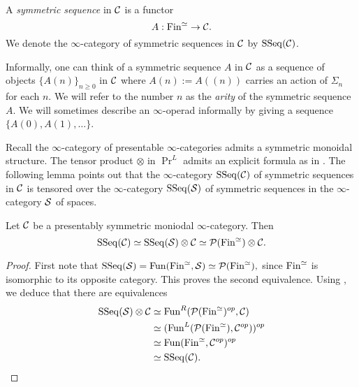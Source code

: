 \begin{definition}
	A \emph{symmetric sequence} in ${\mathcal{C}}$ is a functor 
	$$
	A:\operatorname{Fin}^{\simeq} \to {\mathcal{C}}.
	$$ We denote the $\infty$-category of symmetric sequences in ${\mathcal{C}}$ by $\operatorname{SSeq}({\mathcal{C}})$.
\end{definition}
\begin{remark}
	Informally, one can think of a symmetric sequence $A$ in ${\mathcal{C}}$ as a sequence of objects $\{A(n)\}_{n\geq 0}$ in ${\mathcal{C}}$ where $A(n):= A((n))$ carries an action of $\Sigma_n$ for each $n$.
	We will refer to the number $n$ as the \emph{arity} of the symmetric sequence $A$. We will sometimes describe an $\infty$-operad informally by giving a sequence $\{A(0), A(1), \dots \}$.
	
\end{remark}
Recall the $\infty$-category of presentable $\infty$-categories admits a symmetric monoidal structure. The tensor product $\otimes$ in $\Pr^L$ admits an explicit formula as in \cite[Proposition 4.8.1.17.]{HA}. The following lemma points out that the $\infty$-category $\operatorname{SSeq}({\mathcal{C}})$ of symmetric sequences in ${\mathcal{C}}$ is tensored over the $\infty$-category $\operatorname{SSeq}(\operatorname{\mathcal{S}})$ of symmetric sequences in the $\infty$-category ${\mathcal{S}}$ of spaces.
\begin{lemma}
	 Let ${\mathcal{C}}$ be a presentably symmetric moniodal $\infty$-category.
	Then
	$$
	\operatorname{SSeq}({\mathcal{C}}) \simeq \operatorname{SSeq}(\operatorname{\mathcal{S}})\otimes {\mathcal{C}}
	\simeq {\mathcal{P}}(\operatorname{Fin}^{\simeq})\otimes {\mathcal{C}}.
	$$
\end{lemma}
\begin{proof}
First note that 
$
\operatorname{SSeq}(\operatorname{\mathcal{S}})=\operatorname{Fun}(\operatorname{Fin}^{\simeq}, \operatorname{\mathcal{S}})\simeq {\mathcal{P}}(\operatorname{Fin}^{\simeq}),
$
since $\operatorname{Fin}^{\simeq}$ is isomorphic to its opposite category. This proves the second equivalence.
Using \cite[Proposition 4.8.1.17.]{HA}, we deduce that there are equivalences
\begin{align*}
	\operatorname{SSeq}(\operatorname{\mathcal{S}})\otimes {\mathcal{C}} 
& \simeq 
\operatorname{Fun}^R({\mathcal{P}}(\operatorname{Fin}^{\simeq})^{op},{\mathcal{C}})\\
&\simeq
(\operatorname{Fun}^{L}({\mathcal{P}}(\operatorname{Fin}^{\simeq}), {\mathcal{C}}^{op}))^{op}\\
& \simeq
\operatorname{Fun}(\operatorname{Fin}^{\simeq},{\mathcal{C}}^{op}) ^{op}\\
& \simeq \operatorname{SSeq}({\mathcal{C}}).
\end{align*}



\end{proof}

